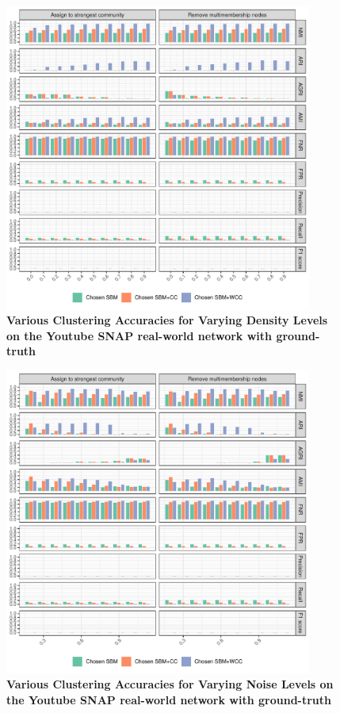 \documentclass[aps,pre,superscriptaddress]{article}
\begin{document}
\begin{figure}[!htpb]
	\centering
	\includegraphics[width=0.9\textwidth]{figures/density_youtube_accuracy.pdf}
	\caption[]{\textbf{Various Clustering Accuracies for Varying Density Levels on the Youtube SNAP real-world network with ground-truth}}
	\label{fig:denisty-youtube-accuracy}
\end{figure}

\begin{figure}[!htpb]
	\centering
	\includegraphics[width=0.9\textwidth]{figures/noise_youtube_accuracy.pdf}
	\caption[]{\textbf{Various Clustering Accuracies for Varying Noise Levels on the Youtube SNAP real-world network with ground-truth}}
	\label{fig:noise-youtube-accuracy}
\end{figure}
\end{document}
